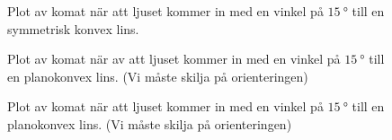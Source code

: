 \documentclass[a4paper]{article}
\begin{document}
\begin{figure}[h]
	\centering
	
	\caption{Plot av komat när att ljuset kommer in med en vinkel på $\SI{15}{\degree}$ till en symmetrisk konvex lins.}
	\label{fig:comSym}
\end{figure}
\begin{figure}[h]
	\centering
	
	\caption{Plot av komat när av att ljuset kommer in med en vinkel på $\SI{15}{\degree}$ till en planokonvex lins. (Vi måste skilja på orienteringen)}
	\label{fig:comP1}
\end{figure}
\begin{figure}[h]
	\centering
	
	\caption{Plot av komat när att ljuset kommer in med en vinkel på $\SI{15}{\degree}$ till en planokonvex lins. (Vi måste skilja på orienteringen)}
	\label{fig:comM1}
\end{figure}

\FloatBarrier

 
 {}
 
\end{document}

